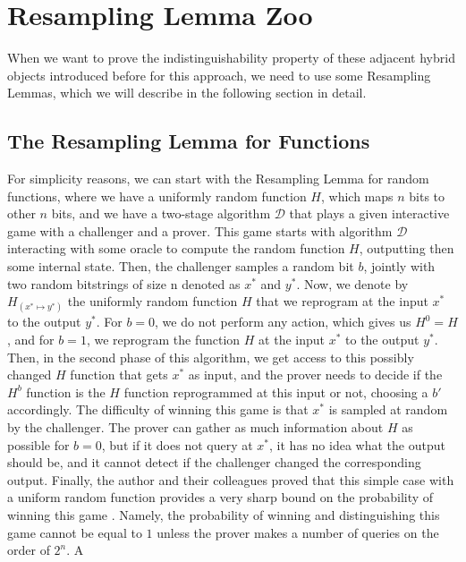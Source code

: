 \documentclass[12pt]{article}
\begin{document}
    
    \section{Resampling Lemma Zoo}
    \label{sec:resampling-lemma-zoo}

    When we want to prove the indistinguishability property of these adjacent hybrid objects introduced before for this approach, we need to use some Resampling Lemmas, which we will describe in the following section in detail.

    
    \subsection{The Resampling Lemma for Functions}
    \label{subsec:resampling-lemma-functions}

    For simplicity reasons, we can start with the Resampling Lemma for random functions, where we have a uniformly random function $H$, which maps $n$ bits to other $n$ bits, and we have a two-stage algorithm $\mathcal{D}$ that plays a given interactive game with a challenger and a prover. This game starts with algorithm $\mathcal{D}$ interacting with some oracle to compute the random function $H$, outputting then some internal state. Then, the challenger samples a random bit $b$, jointly with two random bitstrings of size n denoted as ${x}^{*}$ and ${y}^{*}$. Now, we denote by ${H}_{({x}^{*} \mapsto {y}^{*})}$ the uniformly random function $H$ that we reprogram at the input ${x}^{*}$ to the output ${y}^{*}$. For $b = 0$, we do not perform any action, which gives us ${H}^{0} = H$, and for $b = 1$, we reprogram the function $H$ at the input ${x}^{*}$ to the output ${y}^{*}$. Then, in the second phase of this algorithm, we get access to this possibly changed $H$ function that gets ${x}^{*}$ as input, and the prover needs to decide if the ${H}^{b}$ function is the $H$ function reprogrammed at this input or not, choosing a $b'$ accordingly. The difficulty of winning this game is that ${x}^{*}$ is sampled at random by the challenger. The prover can gather as much information about $H$ as possible for $b = 0$, but if it does not query at ${x}^{*}$, it has no idea what the output should be, and it cannot detect if the challenger changed the corresponding output. Finally, the author and their colleagues proved that this simple case with a uniform random function provides a very sharp bound on the probability of winning this game \cite{grilo-hovelmanns-hulsing-majenz:tight-adaptive-reprogramming-qrom:2021:03-2024}. Namely, the probability of winning and distinguishing this game cannot be equal to $1$ unless the prover makes a number of queries on the order of ${2}^{n}$. A \break
    
\end{document}
